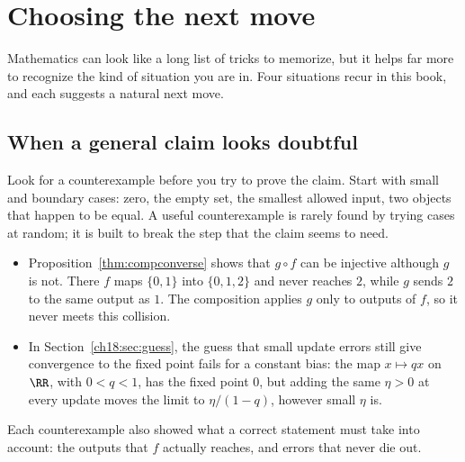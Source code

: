 \section{Choosing the next move}\label{appE:sec:next-move}
Mathematics can look like a long list of tricks to memorize, but it helps far more to recognize the kind of situation you are in. Four situations recur in this book, and each suggests a natural next move.

\subsection*{When a general claim looks doubtful}
Look for a counterexample before you try to prove the claim. Start with small and boundary cases: zero, the empty set, the smallest allowed input, two objects that happen to be equal. A useful counterexample is rarely found by trying cases at random; it is built to break the step that the claim seems to need.
\begin{itemize}
\item Proposition~\ref{thm:compconverse} shows that $g\circ f$ can be injective although $g$ is not. There $f$ maps $\{0,1\}$ into $\{0,1,2\}$ and never reaches $2$, while $g$ sends $2$ to the same output as $1$. The composition applies $g$ only to outputs of $f$, so it never meets this collision.
\item In Section~\ref{ch18:sec:guess}, the guess that small update errors still give convergence to the fixed point fails for a constant bias: the map $x\mapsto qx$ on $\RR$, with $0<q<1$, has the fixed point $0$, but adding the same $\eta>0$ at every update moves the limit to $\eta/(1-q)$, however small $\eta$ is.
\end{itemize}
Each counterexample also showed what a correct statement must take into account: the outputs that $f$ actually reaches, and errors that never die out.

